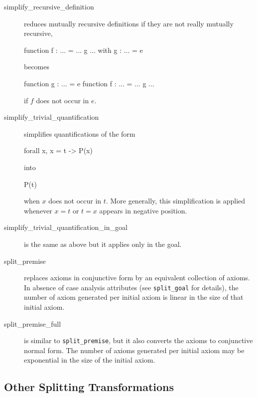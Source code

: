 \begin{description}
\item[simplify\_recursive\_definition] reduces mutually recursive
  definitions if they are not really mutually recursive, \eg
\begin{whycode}
function f : ... = ... g ...
with g : ... = e
\end{whycode}
becomes
\begin{whycode}
function g : ... = e
function f : ... = ... g ...
\end{whycode}
if $f$ does not occur in $e$.

\item[simplify\_trivial\_quantification]
  simplifies quantifications of the form
\begin{whycode}
forall x, x = t -> P(x)
\end{whycode}
into
\begin{whycode}
P(t)
\end{whycode}
  when $x$ does not occur in $t$.
  More generally, this simplification is applied whenever $x=t$ or
  $t=x$ appears in negative position.

\item[simplify\_trivial\_quantification\_in\_goal]
  is the same as above but it applies only in the goal.

\item[split\_premise] replaces axioms in conjunctive form
  by an equivalent collection of axioms.
  In absence of case analysis attributes (see \texttt{split\_goal} for details),
  the number of axiom generated per initial axiom is
  linear in the size of that initial axiom.

\item[split\_premise\_full] is similar to \texttt{split\_premise}, but it
  also converts the axioms to conjunctive normal form. The number of
  axioms generated per initial axiom may be exponential in the size of
  the initial axiom.

\end{description}

\subsection{Other Splitting Transformations}
\label{tech:trans:split}

